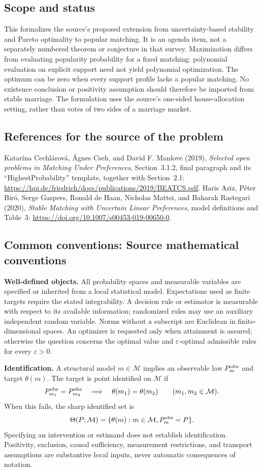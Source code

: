 \documentclass[11pt,a4paper]{article}
\begin{document}
\subsection*{Scope and status}
This formalizes the source's proposed extension from uncertainty-based stability and Pareto optimality to popular matching. It is an agenda item, not a separately numbered theorem or conjecture in that survey. Maximization differs from evaluating popularity probability for a fixed matching: polynomial evaluation on explicit support need not yield polynomial optimization. The optimum can be zero when every support profile lacks a popular matching. No existence conclusion or positivity assumption should therefore be imported from stable marriage. The formulation uses the source's one-sided house-allocation setting, rather than votes of two sides of a marriage market.
\subsection*{References for the source of the problem}
Katar\'ina Cechl\'arov\'a, \'Agnes Cseh, and David F. Manlove (2019), \emph{Selected open problems in Matching Under Preferences}, Section~3.1.2, final paragraph and its ``HighestProbability'' template, together with Section~2.1: \url{https://hpi.de/friedrich/docs/publications/2019/BEATCS.pdf}. Haris Aziz, P\'eter Bir\'o, Serge Gaspers, Ronald de Haan, Nicholas Mattei, and Baharak Rastegari (2020), \emph{Stable Matching with Uncertain Linear Preferences}, model definitions and Table~3: \url{https://doi.org/10.1007/s00453-019-00650-0}.

\subsection*{Common conventions: Source mathematical conventions}

\textbf{Well-defined objects.}
All probability spaces and measurable variables are specified or inherited
from a local statistical model. Expectations used as finite targets require
the stated integrability. A decision rule or estimator is measurable with
respect to its available information; randomized rules may use an auxiliary
independent random variable. Norms without a subscript are Euclidean in
finite-dimensional spaces. An optimizer is requested only when attainment
is assured; otherwise the question concerns the optimal value and
$\varepsilon$-optimal admissible rules for every $\varepsilon>0$.

\textbf{Identification.}
A structural model $m\in\mathcal M$ implies an observable law
$P_m^{\rm obs}$ and target $\theta(m)$. The target is point identified on
$\mathcal M$ if
\[
 P_{m_1}^{\rm obs}=P_{m_2}^{\rm obs}
 \quad\Longrightarrow\quad\theta(m_1)=\theta(m_2)
 \qquad(m_1,m_2\in\mathcal M).
\]
When this fails, the sharp identified set is
\[
 \Theta(P;\mathcal M)=\{\theta(m):m\in\mathcal M,
                                  P_m^{\rm obs}=P\}.
\]
Specifying an intervention or estimand does not establish identification.
Positivity, exclusion, causal sufficiency, measurement restrictions, and
transport assumptions are substantive local inputs, never automatic
consequences of notation.
\end{document}
